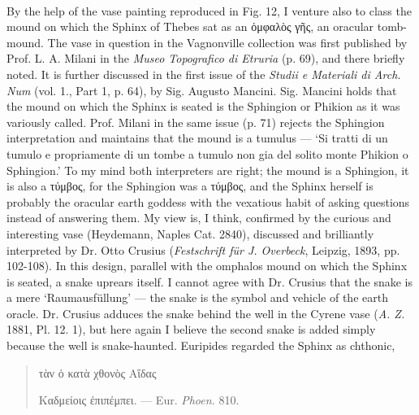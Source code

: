 \documentclass[a4paper, 11pt, oneside, polutonikogreek, english]{article}
\begin{document}
\paragraph{}
By the help of the vase painting reproduced in Fig. 12, I venture also to class the mound on which the Sphinx of Thebes sat as an ὀμφαλὸς γῆς, an oracular tomb-mound. The vase in question in the Vagnonville collection was first published by Prof. L. A. Milani in the \emph{Museo Topografico di Etruria} (p. 69), and there briefly noted. It is further discussed in the first issue of the \emph{Studii e Materiali di Arch. Num} (vol. 1., Part 1, p. 64), by Sig. Augusto Mancini. Sig. Mancini holds that the mound on which the Sphinx is seated is the Sphingion or Phikion as it was variously called. Prof. Milani in the same issue (p. 71) rejects the Sphingion interpretation and maintains that the mound is a tumulus --- `Si tratti di un tumulo e propriamente di un tombe a tumulo non gia del solito monte Phikion o Sphingion.' To my mind both interpreters are right; the mound is a Sphingion, it is also a τύμβος, for the Sphingion was a τύμβος, and the Sphinx herself is probably the oracular earth goddess with the vexatious habit of asking questions instead of answering them. My view is, I think, confirmed by the curious and interesting vase (Heydemann, Naples Cat. 2840), discussed and brilliantly interpreted by Dr. Otto Crusius (\emph{Festschrift für J. Overbeck}, Leipzig, 1893, pp. 102-108). In this design, parallel with the omphalos mound on which the Sphinx is seated, a snake uprears itself. I cannot agree with Dr. Crusius that the snake is a mere `Raumausfüllung' --- the snake is the symbol and vehicle of the earth oracle. Dr. Crusius adduces the snake behind the well in the Cyrene vase (\emph{A. Z.} 1881, Pl. 12. 1), but here again I believe the second snake is added simply because the well is snake-haunted. Euripides regarded the Sphinx as chthonic,
\begin{quotation}
\large
\hspace*{15mm}τὰν ὁ κατὰ χθονὸς Αἵδας

Καδμείοις ἐπιπέμπει. --- Eur. \emph{Phoen.} 810.
\end{quotation}
\end{document}
